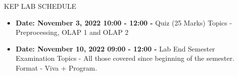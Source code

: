 \documentclass{article}
\begin{document}
	\begin{center}
		KEP LAB SCHEDULE
	\end{center}

	\begin{itemize}
		\item \textbf{Date: November 3, 2022 10:00 - 12:00 -} \newline
			Quiz (25 Marks) \newline Topics - Preprocessing, OLAP 1 and OLAP 2
		\item \textbf{Date: November 10, 2022 09:00 - 12:00 -} \newline
			Lab End Semester Examination \newline
			Topics - All those covered since beginning of the semester. \newline
			Format - Viva + Program.

		
	\end{itemize}
\end{document}
